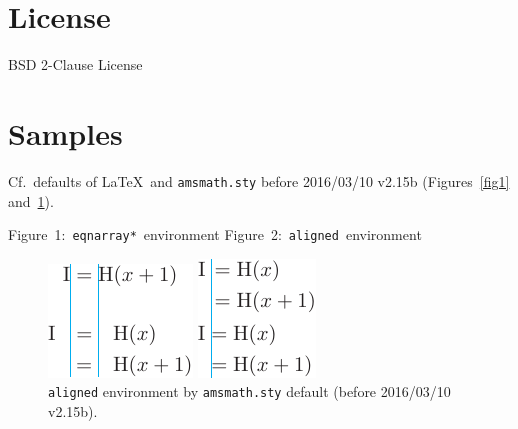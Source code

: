 \documentclass{article}
\begin{document}
\section{License}

BSD 2-Clause License

\section{Samples}

Cf.\ defaults of \LaTeX{}\ and \texttt{amsmath.sty} before 2016/03/10 v2.15b (Figures~\ref{fig1} and~\ref{fig2}).

\hbox{Figure 1: \texttt{eqnarray*} environment}%
\hbox{Figure 2: \texttt{aligned} environment}%
\begin{figure}
 \centering
 \begin{minipage}[t]{\wd9}
  \centering
  \includegraphics{eqnarray-org.pdf}
  \caption{\texttt{eqnarray*} environment by \LaTeX{}\ default.}
  \label{fig1}
 \end{minipage}\qquad
 \begin{minipage}[t]{\wd8}
  \centering
  \includegraphics{aligned-org.pdf}
  \caption{\texttt{aligned} environment by \texttt{amsmath.sty} default (before 2016/03/10 v2.15b).}
  \label{fig2}
 \end{minipage}
\end{figure}
\end{document}
